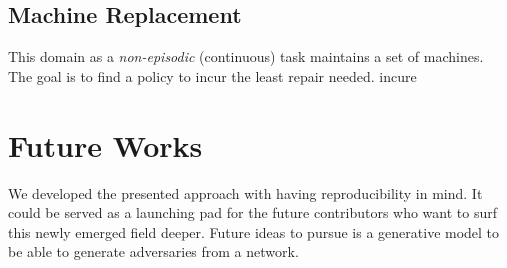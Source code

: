 \documentclass{article}
\begin{document}
    \subsection{Machine Replacement}
    This domain as a \textit{non-episodic} (continuous) task maintains a set of machines.
    The goal is to find a policy to incur the least repair needed.
    incure


\section{Future Works}
    We developed the presented approach with having reproducibility in mind.
    It could be served as a launching pad for the future contributors who want to surf this newly emerged field deeper.
    Future ideas to pursue is a generative model to be able to generate adversaries from a network.




\end{document}
